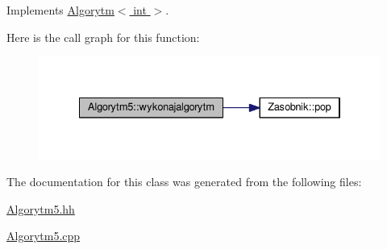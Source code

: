 Implements \hyperlink{a00001_ae97a52b1a728be1a819c9e9815f424e7}{Algorytm$<$ int $>$}.



Here is the call graph for this function\+:
\nopagebreak
\begin{figure}[H]
\begin{center}
\leavevmode
\includegraphics[width=334pt]{a00006_ae6b796569be801a1f5816b7bbd700fa3_cgraph}
\end{center}
\end{figure}




The documentation for this class was generated from the following files\+:\begin{DoxyCompactItemize}
\item 
\hyperlink{a00029}{Algorytm5.\+hh}\item 
\hyperlink{a00028}{Algorytm5.\+cpp}\end{DoxyCompactItemize}
